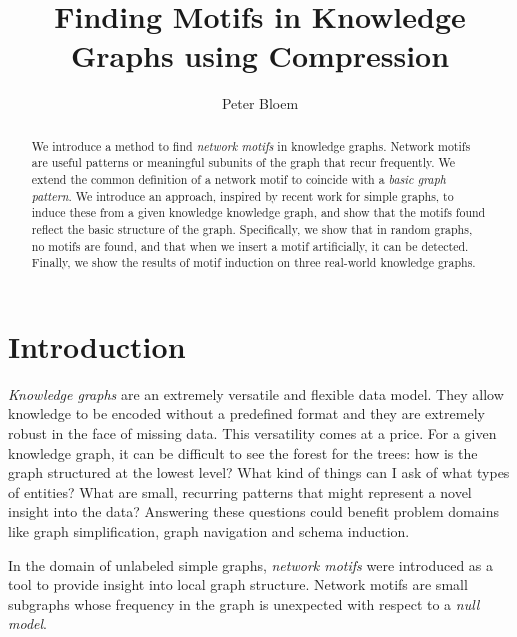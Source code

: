\documentclass[runningheads]{style/llncs}
\begin{document}
\title{Finding Motifs in Knowledge Graphs using Compression}

\author{Peter Bloem\\ }
% 
%
%

\maketitle

\begin{abstract}
\noindent We introduce a method to find \emph{network motifs} in knowledge graphs. Network motifs are useful patterns or meaningful subunits of the graph that recur frequently. We extend the common definition of a network motif to coincide with a \emph{basic graph pattern}. We introduce an approach, inspired by recent work for simple graphs, to induce these from a given knowledge knowledge graph, and show that the motifs found reflect the basic structure of the graph. Specifically, we show that in random graphs, no motifs are found, and that when we insert a motif artificially, it can be detected. Finally, we show the results of motif induction on three real-world knowledge graphs.
\end{abstract}

\section{Introduction}
\noindent \emph{Knowledge graphs} are an extremely versatile and flexible data model. They allow knowledge to be encoded without a predefined format and they are extremely robust in the face of missing data. This versatility comes at a price. For a given knowledge graph, it can be difficult to see the forest for the trees: how is the graph structured at the lowest level? What kind of things can I ask of what types of entities? What are small, recurring patterns that might represent a novel insight into the data? Answering these questions could benefit problem domains like graph simplification, graph navigation and schema induction.

In the domain of unlabeled simple graphs, \emph{network motifs} \cite{milo2002network} were introduced as a tool to provide insight into local graph structure. Network motifs are small subgraphs whose frequency in the graph is unexpected with respect to a \emph{null model}. 
\end{document}
